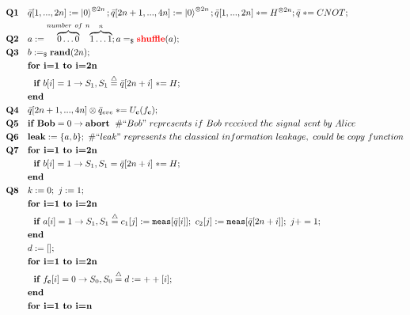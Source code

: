 \documentclass{report}
\theoremstyle{defn_style}
\newcommand{\asteq}{\mathrel{*}=}
\begin{document}
\begin{tcolorbox}[colframe=black!75!black, colback=white, title=Modified Lo-Chau Protocol: Quantum Language Representation]

\begin{align*}
    \textbf{Q1} \quad & \bar{q}[1,...,2n] := \ket{0}^{\otimes 2n}; \bar{q}[2n+1,...,4n] := \ket{0}^{\otimes 2n}; \bar{q}[1,...,2n] \asteq H^{\otimes 2n}; \bar{q} \asteq CNOT; \\
    \textbf{Q2} \quad & a := \overset{number~of~n}{\overbrace{ 0\dots0}}\overset{n}{\overbrace{1\dots1}}; a =_\$ \textbf{\textcolor{red}{shuffle}}(a);\\
    \textbf{Q3} \quad & b :=_\$ \textbf{rand}(2n); \\ &\textbf{for i=1 to i=2n}\\
    &~~ \textbf{if }  b[i] = 1 \rightarrow S_{1} ,S_{1}\stackrel{\triangle}{=}\bar{q}[2n+i] \asteq H ;\\
    &\textbf{end}\ \\
    \textbf{Q4} \quad & \bar{q}[2n+1,...,4n]\otimes \bar{q}_{eve} \asteq U_{\textbf{c}}(f_{\textbf{c}}); \\
    \textbf{Q5} \quad 
    & \textbf{if }  \textbf{Bob} = 0 \rightarrow \textbf{abort} \;~\# ``Bob"~represents~if~Bob~received~the~signal~sent~by~Alice \\
    \textbf{Q6} \quad & \textbf{leak} := \{a, b\};~\# ``leak"~represents~the~classical~information~leakage,~could~be~copy~function \\
    \textbf{Q7} \quad & \textbf{for i=1 to i=2n}\\
    &~~ \textbf{if }  b[i] = 1 \rightarrow S_{1} ,S_{1}=\bar{q}[2n+i] \asteq H ;\\
    &\textbf{end}\\
    \textbf{Q8} \quad & k:=0; ~j:=1; \\
    & \textbf{for~i=1~to~i=2n}\\
    &~~ \textbf{if }  a[i] = 1 \rightarrow S_{1} ,S_{1}\stackrel{\triangle}{=}c_1[j]:= \texttt{meas} [\bar{q}[i]]; ~c_2[j]:= \texttt{meas}[\bar{q}[2n+i]]; ~j+=1;\\
    &\textbf{end}\\
    &d:=[]; \\
    & \textbf{for~i=1~to~i=2n}\\
    &~~ \textbf{if }  f_{\textbf{c}}[i] = 0 \rightarrow S_{0} ,S_{0}\stackrel{\triangle}{=}d:=++[i];\\
    &\textbf{end}\\
    & \textbf{for~i=1~to~i=n}\\

\end{align*}
\end{tcolorbox}
\end{document}

